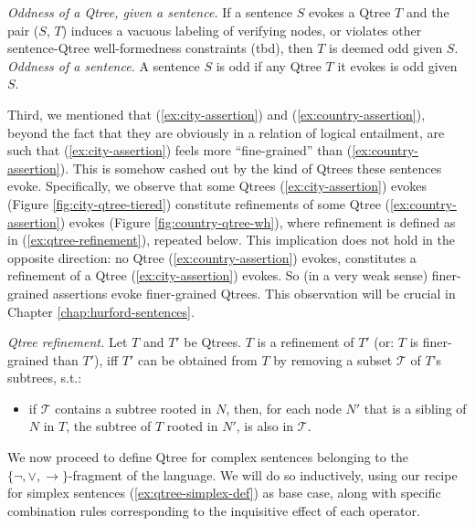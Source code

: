 \begin{exe}
	 {\textit{Oddness of a Qtree, given a sentence.} If a sentence $S$ evokes a Qtree $T$ and the pair ($S$, $T$) induces a vacuous labeling of verifying nodes, or violates other sentence-Qtree well-formedness constraints (tbd), then $T$ is deemed odd given $S$.}
	 {\textit{Oddness of a sentence.} A sentence $S$ is odd if any Qtree $T$ it evokes is odd given $S$.}
\end{exe}


Third, we mentioned that (\ref{ex:city-assertion}) and (\ref{ex:country-assertion}), beyond the fact that they are obviously in a relation of logical entailment, are such that (\ref{ex:city-assertion}) feels more ``fine-grained'' than (\ref{ex:country-assertion}). This is somehow cashed out by the kind of Qtrees these sentences evoke. Specifically, we observe that some Qtrees (\ref{ex:city-assertion}) evokes (Figure \ref{fig:city-qtree-tiered}) constitute refinements of some Qtree (\ref{ex:country-assertion}) evokes (Figure \ref{fig:country-qtree-wh}), where refinement is defined as in (\ref{ex:qtree-refinement}), repeated below. This implication does not hold in the opposite direction: no Qtree (\ref{ex:country-assertion}) evokes, constitutes a refinement of a Qtree (\ref{ex:city-assertion}) evokes. So (in a very weak sense) finer-grained assertions evoke finer-grained Qtrees. This observation will be crucial in Chapter \ref{chap:hurford-sentences}.

\begin{exe}
	 {\textit{Qtree refinement.} Let $T$ and $T'$ be Qtrees. $T$ is a refinement of $T'$ (or: $T$ is finer-grained than $T'$), iff $T'$ can be obtained from $T$ by removing a subset $\mathcal{T}$ of $T$'s subtrees, s.t.:
		\begin{itemize}
			\item if $\mathcal{T}$ contains a subtree rooted in $N$, then, for each node $N'$ that is a sibling of $N$ in $T$, the subtree of $T$ rooted in $N'$, is also in $\mathcal{T}$.
	\end{itemize}}
\end{exe}

We now proceed to define Qtree for complex sentences belonging to the $\lbrace \neg, \vee, \rightarrow\rbrace$-fragment of the language. We will do so inductively, using our recipe for simplex sentences (\ref{ex:qtree-simplex-def}) as base case, along with specific combination rules corresponding to the inquisitive effect of each operator.


